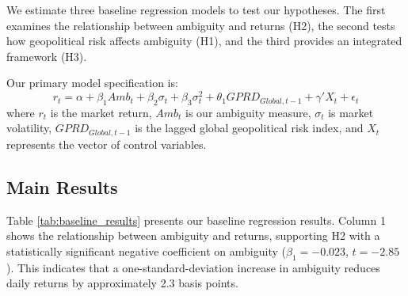 \documentclass[12pt]{article}
\begin{document}
We estimate three baseline regression models to test our hypotheses. The first examines the relationship between ambiguity and returns (H2), the second tests how geopolitical risk affects ambiguity (H1), and the third provides an integrated framework (H3).

Our primary model specification is:
\begin{equation}
r_t = \alpha + \beta_1 Amb_t + \beta_2 \sigma_t + \beta_3 \sigma_t^2 + \theta_1 GPRD_{Global,t-1} + \gamma' X_t + \epsilon_t
\end{equation}
where $r_t$ is the market return, $Amb_t$ is our ambiguity measure, $\sigma_t$ is market volatility, $GPRD_{Global,t-1}$ is the lagged global geopolitical risk index, and $X_t$ represents the vector of control variables.

\subsection{Main Results}

Table \ref{tab:baseline_results} presents our baseline regression results. Column 1 shows the relationship between ambiguity and returns, supporting H2 with a statistically significant negative coefficient on ambiguity ($\beta_1 = -0.023$, $t = -2.85$). This indicates that a one-standard-deviation increase in ambiguity reduces daily returns by approximately 2.3 basis points.
\end{document}
